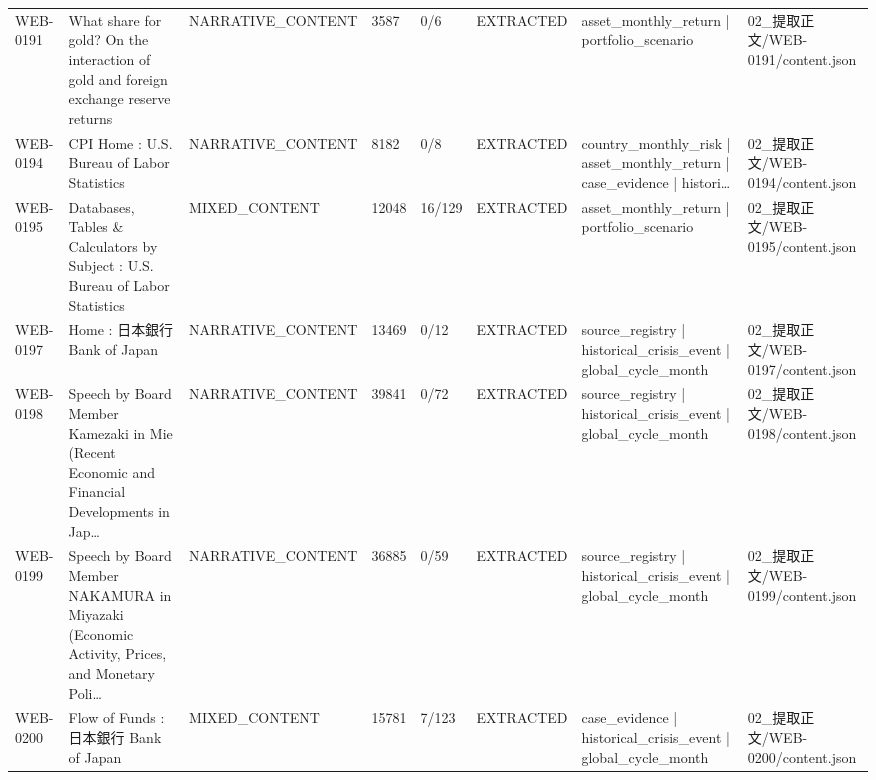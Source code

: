 \begin{landscape}
\begin{longtable}{p{1.8cm}p{4.2cm}p{3.0cm}p{1.4cm}p{1.6cm}p{2.4cm}p{4.2cm}p{4.2cm}}
WEB-0191 & What share for gold? On the interaction of gold and foreign exchange reserve returns & NARRATIVE\_\allowbreak{}CONTENT & 3587 & 0/\allowbreak{}6 & EXTRACTED & asset\_\allowbreak{}monthly\_\allowbreak{}return | portfolio\_\allowbreak{}scenario & 02\_\allowbreak{}提取正文/\allowbreak{}WEB-0191/\allowbreak{}content.json\\
WEB-0194 & CPI Home : U.S. Bureau of Labor Statistics & NARRATIVE\_\allowbreak{}CONTENT & 8182 & 0/\allowbreak{}8 & EXTRACTED & country\_\allowbreak{}monthly\_\allowbreak{}risk | asset\_\allowbreak{}monthly\_\allowbreak{}return | case\_\allowbreak{}evidence | histori… & 02\_\allowbreak{}提取正文/\allowbreak{}WEB-0194/\allowbreak{}content.json\\
WEB-0195 & Databases, Tables \& Calculators by Subject : U.S. Bureau of Labor Statistics & MIXED\_\allowbreak{}CONTENT & 12048 & 16/\allowbreak{}129 & EXTRACTED & asset\_\allowbreak{}monthly\_\allowbreak{}return | portfolio\_\allowbreak{}scenario & 02\_\allowbreak{}提取正文/\allowbreak{}WEB-0195/\allowbreak{}content.json\\
WEB-0197 & Home : 日本銀行 Bank of Japan & NARRATIVE\_\allowbreak{}CONTENT & 13469 & 0/\allowbreak{}12 & EXTRACTED & source\_\allowbreak{}registry | historical\_\allowbreak{}crisis\_\allowbreak{}event | global\_\allowbreak{}cycle\_\allowbreak{}month & 02\_\allowbreak{}提取正文/\allowbreak{}WEB-0197/\allowbreak{}content.json\\
WEB-0198 & Speech by Board Member Kamezaki in Mie (Recent Economic and Financial Developments in Jap… & NARRATIVE\_\allowbreak{}CONTENT & 39841 & 0/\allowbreak{}72 & EXTRACTED & source\_\allowbreak{}registry | historical\_\allowbreak{}crisis\_\allowbreak{}event | global\_\allowbreak{}cycle\_\allowbreak{}month & 02\_\allowbreak{}提取正文/\allowbreak{}WEB-0198/\allowbreak{}content.json\\
WEB-0199 & Speech by Board Member NAKAMURA in Miyazaki (Economic Activity, Prices, and Monetary Poli… & NARRATIVE\_\allowbreak{}CONTENT & 36885 & 0/\allowbreak{}59 & EXTRACTED & source\_\allowbreak{}registry | historical\_\allowbreak{}crisis\_\allowbreak{}event | global\_\allowbreak{}cycle\_\allowbreak{}month & 02\_\allowbreak{}提取正文/\allowbreak{}WEB-0199/\allowbreak{}content.json\\
WEB-0200 & Flow of Funds : 日本銀行 Bank of Japan & MIXED\_\allowbreak{}CONTENT & 15781 & 7/\allowbreak{}123 & EXTRACTED & case\_\allowbreak{}evidence | historical\_\allowbreak{}crisis\_\allowbreak{}event | global\_\allowbreak{}cycle\_\allowbreak{}month & 02\_\allowbreak{}提取正文/\allowbreak{}WEB-0200/\allowbreak{}content.json\\

\end{longtable}
\end{landscape}
